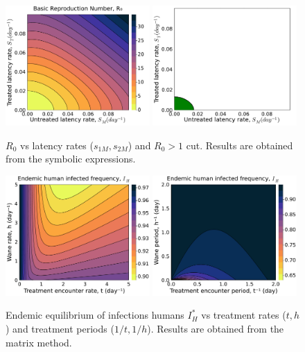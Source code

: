 \documentclass{article}
\begin{document}
\begin{figure}[H]
    \centering
    \includegraphics[width=0.49\textwidth]{../../fig/R0_STxSM_zoom.pdf}
    \includegraphics[width=0.49\textwidth]{../../fig/R0_STxSM_zoom_cut.pdf}
    \caption{\(R_0\) vs latency rates (\(s_{1M},s_{2M}\)) and $R_0 > 1$ cut. Results are obtained from the symbolic expressions.}
\end{figure}

\begin{figure}[H]
    \centering
    \includegraphics[width=0.49\textwidth]{../../fig/Ih_txh.pdf}
    \includegraphics[width=0.49\textwidth]{../../fig/Ih_txh_rev.pdf}
    \caption{Endemic equilibrium of infections humans \(I_H^*\) vs treatment rates (\(t,h\)) and treatment periods (\(1/t,1/h\)). Results are obtained from the matrix method.}
\end{figure}
\end{document}
